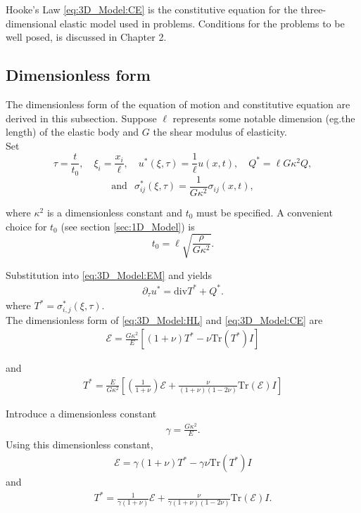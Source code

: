 \documentclass[../../main.tex]{subfiles}
\begin{document}
Hooke's Law \eqref{eq:3D_Model:CE} is the constitutive equation for the three-dimensional elastic model used in problems. Conditions for the problems to be well posed, is discussed in Chapter 2.

\subsection{Dimensionless form} \label{ssec:3D_Model:DimensionlessForm}
The dimensionless form of the equation of motion and constitutive equation are derived in this subsection. Suppose $\ell$ represents some notable dimension (eg.the length) of the elastic body and $G$ the shear modulus of elasticity.\\

Set \[\tau = \frac{t}{t_0},\quad \xi_i = \frac{x_i}{\ell},\quad {u}^*(\xi,\tau) = \frac{1}{\ell}{u}(x,t), \quad Q^{*} = \ell G \kappa^2 Q, \]
\[ \text{and} \ \,\,\, \sigma_{ij}^*(\xi,\tau) = \frac{1}{G\kappa^2}\sigma_{ij}(x,t),\]

where $\kappa^2$ is a dimensionless constant and $t_0$ must be specified. A convenient choice for $t_0$ (see section \ref{sec:1D_Model}) is \[t_0 = \ell\sqrt{\frac{\rho}{G\kappa^2}}.\]

Substitution into \eqref{eq:3D_Model:EM} and yields
\begin{eqnarray*}
	\partial_{\tau} u^{*} = \textrm{div}T^* + Q^*.
\end{eqnarray*}
where $T^* = \sigma_{i,j}^*(\xi,\tau)$.\\

The dimensionless form of \eqref{eq:3D_Model:HL} and \eqref{eq:3D_Model:CE} are
\begin{eqnarray*}
	\mathcal{E} = \frac{G \kappa^2}{E} \left[ (1+\nu)T^* - \nu \textrm{Tr}(T^*)I \right]
\end{eqnarray*}

and
\begin{eqnarray*}
	T^* = \frac{E}{G \kappa^2} \left[\left( \frac{1}{1+\nu} \right)\mathcal{E} + \frac{\nu}{(1+\nu)(1-2\nu)}\textrm{Tr}(\mathcal{E})I \right]
\end{eqnarray*}
 

Introduce a dimensionless constant
\begin{eqnarray*}
	\gamma= \frac{G\kappa^2}{E}.
\end{eqnarray*} Using this dimensionless constant, 
\begin{eqnarray}
	\mathcal{E} = \gamma(1+\nu)T^* - \gamma\nu \textrm{Tr}(T^*)I \label{DM_H_E} 
\end{eqnarray}
and
\begin{eqnarray}
	T^* = \frac{1}{\gamma(1+\nu)}\mathcal{E} + \frac{\nu}{\gamma(1+\nu)(1-2\nu)}\textrm{Tr}(\mathcal{E})I. \label{DM_H_T}
\end{eqnarray}
\end{document}
